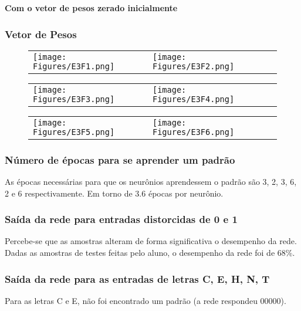 \documentclass[hidelinks,12pt]{article}
\begin{document}
		\textbf{\large Com o vetor de pesos zerado inicialmente}
		
		\subsubsection{Vetor de Pesos}
			
		\begin{figure}[!h]
			\centering
			
			\begin{tabular}{lll}
				\texttt{[image: Figures/E3F1.png]}
				&
				\texttt{[image: Figures/E3F2.png]}
			\end{tabular}
			
			\begin{tabular}{lll}
				\texttt{[image: Figures/E3F3.png]}
				&
				\texttt{[image: Figures/E3F4.png]}
			\end{tabular}
			
			\begin{tabular}{lll}
				\texttt{[image: Figures/E3F5.png]}
				&
				\texttt{[image: Figures/E3F6.png]}
			\end{tabular}
			
		\end{figure}
		
		\subsubsection{Número de épocas para se aprender um padrão}
			
			As épocas necessárias para que os neurônios aprendessem o padrão são 3, 2, 3, 6, 2 e 6 respectivamente. Em torno de 3.6 épocas por neurônio.
			
		\subsubsection{Saída da rede para entradas distorcidas de 0 e 1}
		
			Percebe-se que as amostras alteram de forma significativa o desempenho da rede. Dadas as amostras de testes feitas pelo aluno, o desempenho da rede foi de 68\%.
		
		\subsubsection{Saída da rede para as entradas de letras C, E, H, N, T}
		
			Para as letras C e E, não foi encontrado um padrão (a rede respondeu 00000).
			
\end{document}
